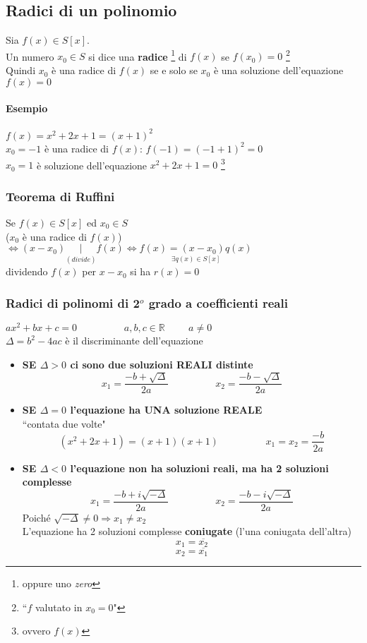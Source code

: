    \subsection{Radici di un polinomio}
    Sia $f(x) \in S[x]$. \\
    Un numero $x_0\in S$ si dice una \textbf{radice} \footnote{oppure uno 
    \textit{zero}} di $f(x)$ se $f(x_0)=0$ \footnote{``$f$ valutato in $x_0=0$"}\\
    Quindi $x_0$  è una radice di $f(x)$ se e solo se $x_0$ è una soluzione
    dell'equazione $f(x)=0$
    \paragraph{Esempio} $f(x)=x^2+2x+1=(x+1)^2$\\
    $x_0=-1$ è una radice di $f(x)$: $f(-1)=(-1+1)^2=0$\\
    $x_0=1$ è soluzione dell'equazione $x^2+2x+1=0$ \footnote{ovvero $f(x)$}
    \subsubsection{Teorema di Ruffini} 
    Se $f(x)\in S[x]$ ed $x_0\in S$\\
    ($x_0$ è una radice di $f(x)$) $\Longleftrightarrow (x-x_0)\underset{(divide)}{|}
    f(x) \Longleftrightarrow \underset{\exists q(x)\in S[x]}{f(x)=(x-x_0)q(x)}$\\
    dividendo $f(x)$ per $x-x_0$ si ha $r(x)=0$
    \subsubsection{Radici di polinomi di 2$^o$ grado a coefficienti reali}
    $ax^2+bx+c=0\hspace{2cm}a,b,c\in\mathbb{R}\hspace{1cm}a\neq 0 $\\
    $\Delta = b^2-4ac$ è il discriminante dell'equazione
    \begin{itemize}
        \item \textbf{SE $\Delta > 0$ ci sono due soluzioni REALI distinte}
            $$x_1=\frac{-b+\sqrt{\Delta}}{2a}\hspace{2cm}
            x_2=\frac{-b-\sqrt{\Delta}}{2a}$$
        \item \textbf{SE $\Delta = 0$ l'equazione ha UNA soluzione REALE} \\
            ``contata due volte"
            $$(x^2+2x+1)=(x+1)(x+1) \hspace{2cm} x_1=x_2=\frac{-b}{2a}$$
        \item \textbf{SE $\Delta < 0$ l'equazione non ha soluzioni reali, ma
            ha 2 soluzioni complesse}
            $$x_1=\frac{-b+i\sqrt{-\Delta}}{2a}\hspace{2cm}
            x_2=\frac{-b-i\sqrt{-\Delta}}{2a}$$
            \color{red}
            Poiché $\sqrt{-\Delta}\neq 0 \Longrightarrow x_1\neq x_2$\\
            L'equazione ha 2 soluzioni complesse \textbf{coniugate}
            (l'una coniugata dell'altra)
            $$x_1=\overline{x_2}$$
            $$x_2=\overline{x_1}$$
    \end{itemize}
